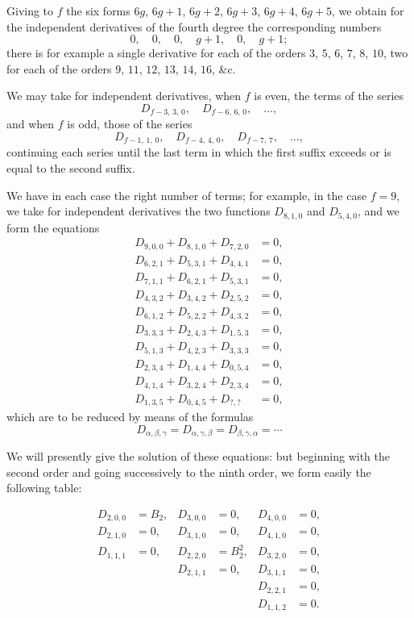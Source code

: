 \documentclass[11pt,a4paper]{article}
\theoremstyle{definition}
\begin{document}
Giving to $f$ the six forms $6g$, $6g+1$, $6g+2$, $6g+3$, $6g+4$, $6g+5$, we obtain for the independent derivatives of the fourth degree the corresponding numbers
\[
0,\quad 0,\quad 0,\quad g+1,\quad 0,\quad g+1;
\]
there is for example a single derivative for each of the orders $3$, $5$, $6$, $7$, $8$, $10$, two for each of the orders $9$, $11$, $12$, $13$, $14$, $16$, \&c.

We may take for independent derivatives, when $f$ is even, the terms of the series
\[
D_{f-3,\,3,\,0},\quad D_{f-6,\,6,\,0},\quad \ldots,
\]
and when $f$ is odd, those of the series
\[
D_{f-1,\,1,\,0},\quad D_{f-4,\,4,\,0},\quad D_{f-7,\,7},\quad \ldots,
\]
continuing each series until the last term in which the first suffix exceeds or is equal to the second suffix.

We have in each case the right number of terms; for example, in the case $f = 9$, we take for independent derivatives the two functions $D_{8,1,0}$ and $D_{5,4,0}$, and we form the equations
\begin{align*}
D_{9,0,0} + D_{8,1,0} + D_{7,2,0} &= 0,\\
D_{6,2,1} + D_{5,3,1} + D_{4,4,1} &= 0,\\
D_{7,1,1} + D_{6,2,1} + D_{5,3,1} &= 0,\\
D_{4,3,2} + D_{3,4,2} + D_{2,5,2} &= 0,\\
D_{6,1,2} + D_{5,2,2} + D_{4,3,2} &= 0,\\
D_{3,3,3} + D_{2,4,3} + D_{1,5,3} &= 0,\\
D_{5,1,3} + D_{4,2,3} + D_{3,3,3} &= 0,\\
D_{2,3,4} + D_{1,4,4} + D_{0,5,4} &= 0,\\
D_{4,1,4} + D_{3,2,4} + D_{2,3,4} &= 0,\\
D_{1,3,5} + D_{0,4,5} + D_{?,?} &= 0,
\end{align*}
which are to be reduced by means of the formulas
\[
D_{\alpha,\beta,\gamma} = D_{\alpha,\gamma,\beta} = D_{\beta,\gamma,\alpha} = \cdots
\]

We will presently give the solution of these equations: but beginning with the second order and going successively to the ninth order, we form easily the following table:

\begin{align*}
D_{2,0,0} &= B_2, & D_{3,0,0} &= 0, & D_{4,0,0} &= 0,\\
D_{2,1,0} &= 0, & D_{3,1,0} &= 0, & D_{4,1,0} &= 0,\\
D_{1,1,1} &= 0, & D_{2,2,0} &= B_2^2, & D_{3,2,0} &= 0,\\
& & D_{2,1,1} &= 0, & D_{3,1,1} &= 0,\\
& & & & D_{2,2,1} &= 0,\\
& & & & D_{1,1,2} &= 0.
\end{align*}
\end{document}
